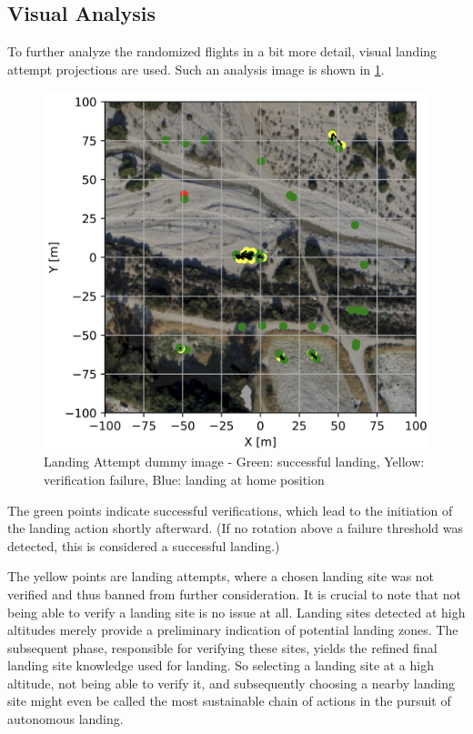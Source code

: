 \subsection{Visual Analysis}
To further analyze the randomized flights in a bit more detail, visual landing attempt projections are used. Such an analysis image is shown in \cref{fig:landing_attempts_dummy}.

\begin{figure}[h]
    \begin{center}
        \includegraphics[scale=0.5]{images/evaluation/landings_random_WP_GT.png}
        \caption{Landing Attempt dummy image - Green: successful landing, Yellow: verification failure, Blue: landing at home position}
        \label{fig:landing_attempts_dummy}
    \end{center}
\end{figure}

The green points indicate successful verifications, which lead to the initiation of the landing action shortly afterward. (If no rotation above a failure threshold was detected, this is considered a successful landing.) 

The yellow points are landing attempts, where a chosen landing site was not verified and thus banned from further consideration. It is crucial to note that not being able to verify a landing site is no issue at all. Landing sites detected at high altitudes merely provide a preliminary indication of potential landing zones. The subsequent phase, responsible for verifying these sites, yields the refined final landing site knowledge used for landing. So selecting a landing site at a high altitude, not being able to verify it, and subsequently choosing a nearby landing site might even be called the most sustainable chain of actions in the pursuit of autonomous landing.

